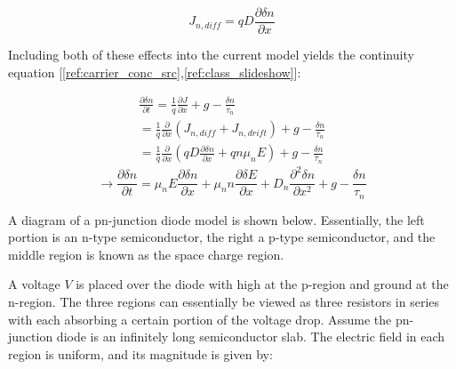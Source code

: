 \begin{equation}
	\label{eq:diffusion}
	J_{n,diff} = qD\frac{\partial \delta n}{\partial x}
\end{equation}

Including both of these effects into the current model yields the continuity equation [\ref{ref:carrier_conc_src},\ref{ref:class_slideshow}]:

\begin{align*}
	\frac{\partial \delta n}{\partial t} = \frac{1}{q} \frac{\partial J}{\partial x} + g - \frac{\delta n}{\tau _n} \\
					     = \frac{1}{q} \frac{\partial}{\partial x} ( J_{n,diff} + J_{n,drift}) + g - \frac{\delta n}{\tau _n} \\
					     = \frac{1}{q} \frac{\partial}{\partial x} ( qD\frac{\partial \delta n}{\partial x} + qn\mu _nE ) + g - \frac{\delta n}{\tau _n}
\end{align*}
\begin{equation}
	\label{eq:cont_eqn}
	\rightarrow \frac{\partial \delta n}{\partial t} = \mu _n E \frac{\partial \delta n}{\partial x} + \mu _n n \frac{\partial \delta E}{\partial x} + D_n \frac{\partial^2 \delta n}{\partial x^2} + g - \frac{\delta n}{\tau _n}
\end{equation}

A diagram of a pn-junction diode model is shown below. Essentially, the left portion is an n-type semiconductor, the right a p-type semiconductor, and the middle region is known as the space charge region.


A voltage $V$ is placed over the diode with high at the p-region and ground at the n-region. The three regions can essentially be viewed as three resistors in series with each absorbing a certain portion of the voltage drop. Assume the pn-junction diode is an infinitely long semiconductor slab. The electric field in each region is uniform, and its magnitude is given by:

